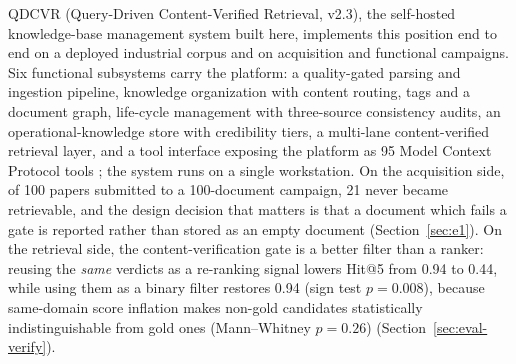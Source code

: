QDCVR (Query-Driven Content-Verified Retrieval, v2.3), the self-hosted
knowledge-base management system built here,
implements this position end to end on a deployed industrial corpus and on
acquisition and functional campaigns. Six functional subsystems carry the
platform: a quality-gated parsing and ingestion pipeline, knowledge
organization with content routing, tags and a document graph, life-cycle
management with three-source consistency audits, an operational-knowledge store
with credibility tiers, a multi-lane content-verified retrieval layer, and a
tool interface exposing the platform as 95 Model Context Protocol tools
\cite{mcp}; the system runs on a single workstation. On the acquisition side,
of 100 papers submitted to a 100-document campaign, 21 never became
retrievable, and the
design decision that matters is that a document which fails a gate is
reported rather than
stored as an empty document (Section~\ref{sec:e1}). On the retrieval side, the
content-verification gate is a better filter than a ranker: reusing the
\emph{same} verdicts as a re-ranking signal lowers Hit@5 from 0.94 to 0.44,
while using them as a binary filter restores 0.94 (sign test $p = 0.008$),
because same-domain score inflation makes non-gold candidates statistically
indistinguishable from gold ones (Mann--Whitney $p = 0.26$)
(Section~\ref{sec:eval-verify}).


